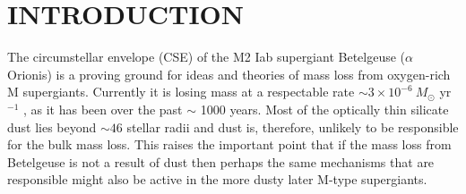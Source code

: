 \documentclass[iop]{emulateapj}
\begin{document}

\section{INTRODUCTION}
The circumstellar envelope (CSE) of the M2 Iab supergiant Betelgeuse ($\alpha$ Orionis) is a proving ground for ideas and theories of mass loss from oxygen-rich M supergiants. Currently it is losing mass at a respectable rate $\sim 3\times 10^{-6} \ M{}_{\odot}$ yr${}^{-1}$ \citep{1986ApJ...306..605G, 1994ApJ...424L.127H,harper_2001}, as it has been over the past $\sim$ 1000 years. Most of the optically thin silicate dust lies beyond $\sim 46$ stellar radii \citep{1994AJ....107.1469D} and dust is, therefore, unlikely to be responsible for the bulk mass loss. This raises the important point that if the mass loss from Betelgeuse is not a result of dust then perhaps the same mechanisms that are responsible might also be active in the more dusty later M-type supergiants. 
\end{document}

